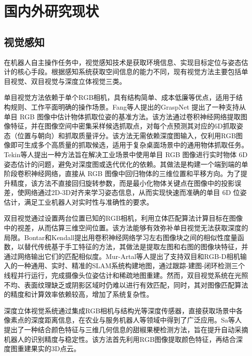 \section{国内外研究现状}
\subsection{视觉感知}

在机器人自主操作任务中，视觉感知技术\cite{wade2013visual}是获取环境信息、实现目标定位与姿态估计的核心手段。根据感知系统获取空间信息的能力不同，现有视觉方法主要包括单目视觉\cite{celik2013monocular}、双目视觉\cite{blake2011binocular}与深度立体视觉\cite{howard2012perceiving}三类。

单目视觉方法依赖于单个RGB相机，具有结构简单、成本低廉等优点，适用于结构规则、工作平面明确的操作场景。Fang等人\cite{fang1billion}提出的GraspNet 提出了一种支持从单目 RGB 图像中估计物体抓取位姿的基准方法。该方法通过卷积神经网络提取图像特征，并在图像空间中密集采样候选抓取点，对每个点预测其对应的6D抓取姿态（位置与朝向）和抓取质量评分。该方法无需依赖深度图输入，仅利用RGB图像即可生成多个高质量的抓取候选，适用于复杂桌面场景中的通用物体抓取任务。Tekin等人\cite{tekin2018real}提出一种方法旨在解决工业场景中使用单目 RGB 图像进行实时物体 6D 姿态估计的问题，避免对深度图或迭代优化的依赖。其做法是构建一个端到端的单阶段卷积神经网络，直接从 RGB 图像中回归物体的三维位置和平移方向。为了提升精度，该方法不直接回归旋转参数，而是最小化物体关键点在图像中的投影误差，使网络通过2D-3D对齐来学习姿态信息，从而实现快速而准确的单目 6D 位姿估计，满足工业机器人对实时性与准确性的要求。

双目视觉通过设置两台位置已知的RGB相机，利用立体匹配算法计算目标在图像中的视差，从而估算三维空间位置。该方法能够有效弥补单目视觉无法获取深度的局限。Bontar和Kendall\cite{vzbontar2016stereo,kendall2017end}提出用卷积神经网络\cite{o2015introduction}学习左右图像块之间的相似性度量函数，以替代传统基于手工特征的方法，其做法是提取左图和右图的图像块特征，并通过网络输出它们的匹配相似度。Mur-Artal等人\cite{mur2017orb}提出了支持双目和RGB-D相机输入的一种通用、实时、精准的SLAM系统构建地图，通过跟踪-建图-闭环检测三个线程并行运行，完成摄像头位姿估计和稀疏地图重建。然而，双目视觉系统在光照不均、表面纹理缺乏或阴影区域时仍难以进行有效匹配，同时，其对图像匹配算法的精度和计算效率依赖较高，增加了系统复杂性。

深度立体视觉系统通过集成RGB相机与结构光等深度传感器，直接获取场景中各像素点的深度距离信息，在农业与服务机器人等领域中得到了广泛应用。Sa等人\cite{sa2017peduncle}提出了一种结合颜色特征与三维几何信息的甜椒果梗检测方法，旨在提升自动采摘机器人的识别精度与稳定性。该方法首先利用RGB图像提取颜色特征，再结合深度图重建果实的3D点云。

